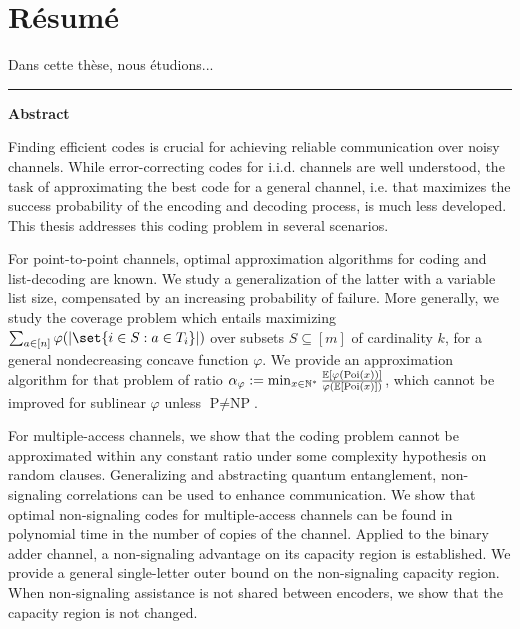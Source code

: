 \chapter*{Résumé}

\begin{otherlanguage}{french}
  Dans cette thèse, nous étudions...
\end{otherlanguage}
\clearpage 

\flushright
\bigskip
\hrule \bigskip \bigskip
{\Huge \textbf{\textsf{Abstract}}}
\flushleftright
{}
\vspace{1.5cm}

Finding efficient codes is crucial for achieving reliable communication over noisy channels. While error-correcting codes for i.i.d. channels are well understood, the task of approximating the best code for a general channel, i.e. that maximizes the success probability of the encoding and decoding process, is much less developed. This thesis addresses this coding problem in several scenarios.

For point-to-point channels, optimal approximation algorithms for coding and list-decoding are known. We study a generalization of the latter with a variable list size, compensated by an increasing probability of failure. More generally, we study the coverage problem which entails maximizing $\sum_{a \in [n]}  \varphi(\abs{\set{i \in S : a \in T_i}})$ over subsets $S \subseteq [m]$ of cardinality $k$, for a general nondecreasing concave function $\varphi$. We provide an approximation algorithm for that problem of ratio $\alpha_{\varphi} := \min_{x \in \mathbb{N}^*} \frac{\mathbb{E}[\varphi(\operatorname{\text{Poi}}(x))]}{\varphi(\mathbb{E}[\operatorname{\text{Poi}}(x)])}$, which cannot be improved for sublinear $\varphi$ unless $\textrm{P}\not=\textrm{NP}$.

For multiple-access channels, we show that the coding problem cannot be approximated within any constant ratio under some complexity hypothesis on random clauses. Generalizing and abstracting quantum entanglement, non-signaling correlations can be used to enhance communication. We show that optimal non-signaling codes for multiple-access channels can be found in polynomial time in the number of copies of the channel. Applied to the binary adder channel, a non-signaling advantage on its capacity region is established. We provide a general single-letter outer bound on the non-signaling capacity region. When non-signaling assistance is not shared between encoders, we show that the capacity region is not changed.

